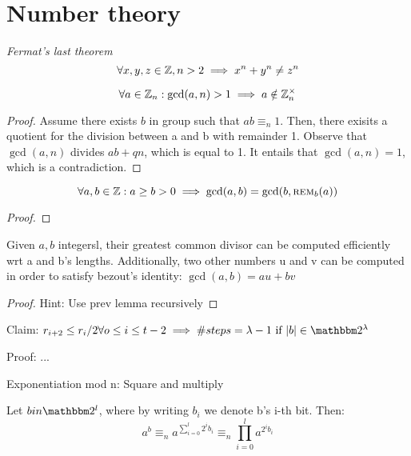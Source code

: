 
\section{Number theory}

\begin{theorem} \emph{Fermat's last theorem}
    \[
        \forall x, y, z \in \mathbb{Z}, n > 2 \implies x^n + y^n \neq z^n
    \]
\end{theorem}

\begin{lemma}
    \[
        \forall a \in \mathbb{Z}_n : \gcd(a, n) > 1 \implies a \notin \mathbb{Z}_n^\times
    \]
\end{lemma}

\begin{proof}
    Assume there exists $b$ in group such that $ab \equiv_n 1$. Then, there exisits a quotient for the division between a and b with remainder 1. Observe that $\gcd(a, n)$ divides $ab + qn$, which is equal to 1. It entails that $\gcd(a, n) = 1$, which is a contradiction.
\end{proof}

\begin{lemma}
    \[
        \forall a, b \in \mathbb{Z} : a \geq b > 0 \implies \gcd(a, b) = \gcd(b, \textsc{rem}_b(a))
    \]
\end{lemma}

\begin{proof}
    
\end{proof}

\begin{theorem}
    Given $a, b$ integersl, their greatest common divisor can be computed efficiently wrt a and b's lengths. Additionally, two other numbers u and v can be computed in order to satisfy bezout's identity: $\gcd(a, b) = au + bv$
\end{theorem}

\begin{proof}
    Hint: Use prev lemma recursively
\end{proof}

Claim: $r_{i+2} \leq r_i/2 \forall o \leq i \leq t-2 \implies \#steps = \lambda - 1 \text{ if } |b| \in \binary^\lambda$

Proof: ...


\begin{definition}
    Exponentiation mod n: Square and multiply

    Let $b in \binary^l$, where by writing $b_i$ we denote b's i-th bit. Then:
    \[
        a^b \equiv_n a^{\sum_{i=0}^l 2^ib_i} \equiv_n \prod_{i=0}^l a^{2^ib_i} 
    \]
\end{definition}

